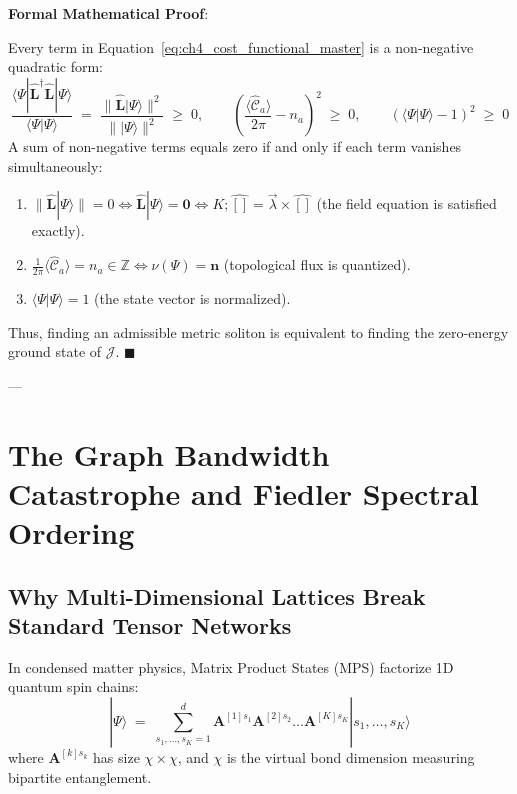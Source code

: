 \documentclass[
    12pt,
    a4paper,
    headings=normal,
    twoside=false,
    open=any,
    parskip=half
]{scrbook}
\newenvironment{myproof}[1][]{%
  \par\vspace{6pt}\noindent\textbf{\sffamily\color{maincolor}Formal Mathematical Proof\ifstrempty{#1}{}{ (#1)}}:\par\nopagebreak
}{%
  \penalty50\hfill\ensuremath{\blacksquare}\par\vspace{6pt}
}
\begin{document}
\begin{myproof}
Every term in Equation~\eqref{eq:ch4_cost_functional_master} is a non-negative quadratic form:
\begin{equation*}
\frac{\langle \Psi | \hat{\mathbf{L}}^\dagger \hat{\mathbf{L}} | \Psi \rangle}{\langle \Psi | \Psi \rangle} \;=\; \frac{\| \hat{\mathbf{L}} | \Psi \rangle \|^2}{\| |\Psi\rangle \|^2} \;\ge\; 0, \qquad \left( \frac{\langle \hat{\mathcal{C}}_a \rangle}{2\pi} - n_a \right)^2 \;\ge\; 0, \qquad \left( \langle \Psi | \Psi \rangle - 1 \right)^2 \;\ge\; 0
\end{equation*}
A sum of non-negative terms equals zero if and only if each term vanishes simultaneously:
\begin{enumerate}[label=(\alph*), noitemsep]
    \item $\| \hat{\mathbf{L}} | \Psi \rangle \| = 0 \iff \hat{\mathbf{L}} | \Psi \rangle = \mathbf{0} \iff K ; \hat{\mathbf{[]}} = \vec{\lambda} \times \hat{\mathbf{[]}}$ (the field equation is satisfied exactly).
    \item $\frac{1}{2\pi}\langle \hat{\mathcal{C}}_a \rangle = n_a \in \mathbb{Z} \iff \nu(\Psi) = \mathbf{n}$ (topological flux is quantized).
    \item $\langle \Psi | \Psi \rangle = 1$ (the state vector is normalized).
\end{enumerate}
Thus, finding an admissible metric soliton is equivalent to finding the zero-energy ground state of $\mathcal{J}$.
\end{myproof}

---

\section{The Graph Bandwidth Catastrophe and Fiedler Spectral Ordering}
\label{sec:ch4_fiedler_ordering}

\subsection{Why Multi-Dimensional Lattices Break Standard Tensor Networks}

In condensed matter physics, Matrix Product States (MPS) factorize 1D quantum spin chains:
\begin{equation}
|\Psi\rangle \;=\; \sum_{s_1, \dots, s_K = 1}^d \mathbf{A}^{[1]s_1} \mathbf{A}^{[2]s_2} \dots \mathbf{A}^{[K]s_K} |s_1, \dots, s_K\rangle
\label{eq:ch4_mps_chain_ansatz}
\end{equation}
where $\mathbf{A}^{[k]s_k}$ has size $\chi \times \chi$, and $\chi$ is the virtual bond dimension measuring bipartite entanglement.
\end{document}
